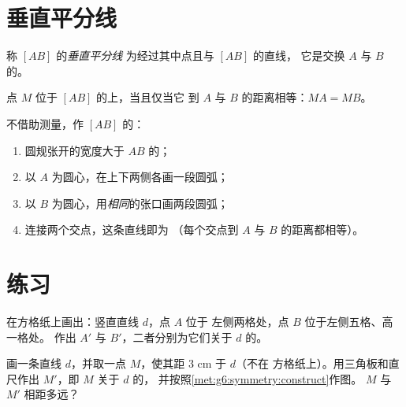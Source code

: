 \section{垂直平分线}

\begin{definition}[垂直平分线]\label{def:g6:symmetry:bisector}
称 $[AB]$ 的\emph{垂直平分线}
为经过其中点且与 $[AB]$ 的直线，
它是交换 $A$ 与 $B$ 的。
\end{definition}

\begin{proposition}[等距性]\label{prop:g6:symmetry:bisector}
点 $M$ 位于 $[AB]$ 的上，当且仅当它
到 $A$ 与 $B$ 的距离相等：$MA = MB$。
\end{proposition}
\admitted

\begin{method}[圆规作图]\label{met:g6:symmetry:bisector}
不借助测量，作 $[AB]$ 的：
\begin{enumerate}
  \item 圆规张开的宽度大于 $AB$ 的；
  \item 以 $A$ 为圆心，在上下两侧各画一段圆弧；
  \item 以 $B$ 为圆心，用\emph{相同}的张口画两段圆弧；
  \item 连接两个交点，这条直线即为
        （每个交点到 $A$ 与 $B$ 的距离都相等）。
\end{enumerate}
\end{method}

\section{练习}

\begin{exercise}[$\star$]\label{exo:g6:symmetry:1}
在方格纸上画出：竖直直线 $d$，点 $A$ 位于
左侧两格处，点 $B$ 位于左侧五格、高一格处。
作出 $A'$ 与 $B'$，二者分别为它们关于 $d$ 的。
\end{exercise}

\begin{exercise}[$\star$]\label{exo:g6:symmetry:2}
画一条直线 $d$，并取一点 $M$，使其距 $3$ cm 于 $d$（不在
方格纸上）。用三角板和直尺作出 $M'$，即 $M$ 关于 $d$ 的，
并按照\cref{met:g6:symmetry:construct}作图。
$M$ 与 $M'$ 相距多远？
\end{exercise}


